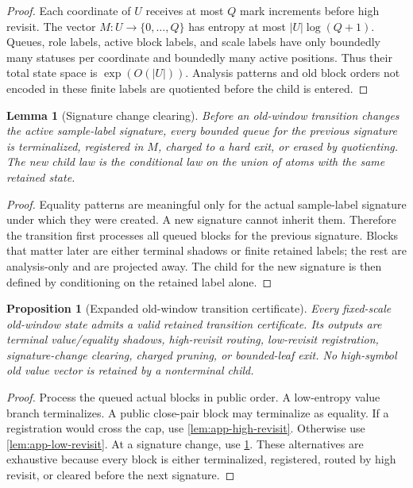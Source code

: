 \documentclass[11pt]{article}
\newcommand{\Cref}[1]{\ref{#1}}
\newtheorem{lemma}[theorem]{Lemma}
\newtheorem{proposition}[theorem]{Proposition}
\theoremstyle{remark}
\begin{document}
\begin{proof}
Each coordinate of $U$ receives at most $Q$ mark increments before high revisit.  The vector $M:U\to\{0,\ldots,Q\}$ has entropy at most $|U|\log(Q+1)$.  Queues, role labels, active block labels, and scale labels have only boundedly many statuses per coordinate and boundedly many active positions.  Thus their total state space is $\exp(O(|U|))$.  Analysis patterns and old block orders not encoded in these finite labels are quotiented before the child is entered.
\end{proof}

\begin{lemma}[Signature change clearing]\label{lem:app-signature-clear}
Before an old-window transition changes the active sample-label signature, every bounded queue for the previous signature is terminalized, registered in $M$, charged to a hard exit, or erased by quotienting.  The new child law is the conditional law on the union of atoms with the same retained state.
\end{lemma}

\begin{proof}
Equality patterns are meaningful only for the actual sample-label signature under which they were created.  A new signature cannot inherit them.  Therefore the transition first processes all queued blocks for the previous signature.  Blocks that matter later are either terminal shadows or finite retained labels; the rest are analysis-only and are projected away.  The child for the new signature is then defined by conditioning on the retained label alone.
\end{proof}

\begin{proposition}[Expanded old-window transition certificate]\label{prop:app-old-window-certificate}
Every fixed-scale old-window state admits a valid retained transition certificate.  Its outputs are terminal value/equality shadows, high-revisit routing, low-revisit registration, signature-change clearing, charged pruning, or bounded-leaf exit.  No high-symbol old value vector is retained by a nonterminal child.
\end{proposition}

\begin{proof}
Process the queued actual blocks in public order.  A low-entropy value branch terminalizes.  A public close-pair block may terminalize as equality.  If a registration would cross the cap, use \Cref{lem:app-high-revisit}.  Otherwise use \Cref{lem:app-low-revisit}.  At a signature change, use \Cref{lem:app-signature-clear}.  These alternatives are exhaustive because every block is either terminalized, registered, routed by high revisit, or cleared before the next signature.
\end{proof}
\end{document}
